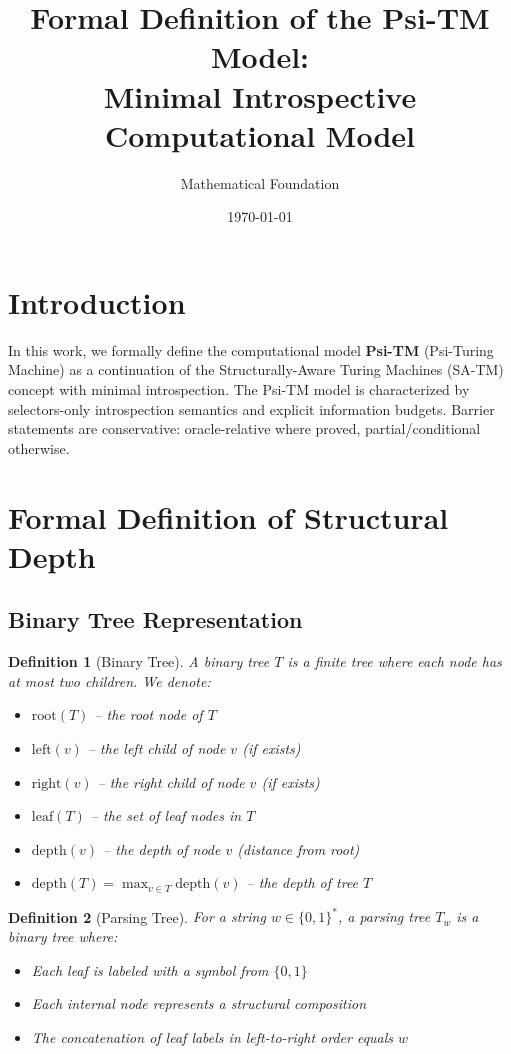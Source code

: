 \documentclass[11pt]{article}
\title{Formal Definition of the Psi-TM Model:\\
Minimal Introspective Computational Model}
\author{Mathematical Foundation}
\date{\today}
\newtheorem{definition}{Definition}
\begin{document}
\maketitle

\section{Introduction}

In this work, we formally define the computational model \textbf{Psi-TM} (Psi-Turing Machine) as a continuation of the Structurally-Aware Turing Machines (SA-TM) concept with minimal introspection. The Psi-TM model is characterized by selectors-only introspection semantics and explicit information budgets. Barrier statements are conservative: oracle-relative where proved, partial/conditional otherwise.

\section{Formal Definition of Structural Depth}

\subsection{Binary Tree Representation}

\begin{definition}[Binary Tree]
A binary tree $T$ is a finite tree where each node has at most two children. We denote:
\begin{itemize}
\item $\text{root}(T)$ -- the root node of $T$
\item $\text{left}(v)$ -- the left child of node $v$ (if exists)
\item $\text{right}(v)$ -- the right child of node $v$ (if exists)
\item $\text{leaf}(T)$ -- the set of leaf nodes in $T$
\item $\text{depth}(v)$ -- the depth of node $v$ (distance from root)
\item $\text{depth}(T) = \max_{v \in T} \text{depth}(v)$ -- the depth of tree $T$
\end{itemize}
\end{definition}

\begin{definition}[Parsing Tree]
For a string $w \in \{0,1\}^*$, a parsing tree $T_w$ is a binary tree where:
\begin{itemize}
\item Each leaf is labeled with a symbol from $\{0,1\}$
\item Each internal node represents a structural composition
\item The concatenation of leaf labels in left-to-right order equals $w$
\end{itemize}
\end{definition}
\end{document}
